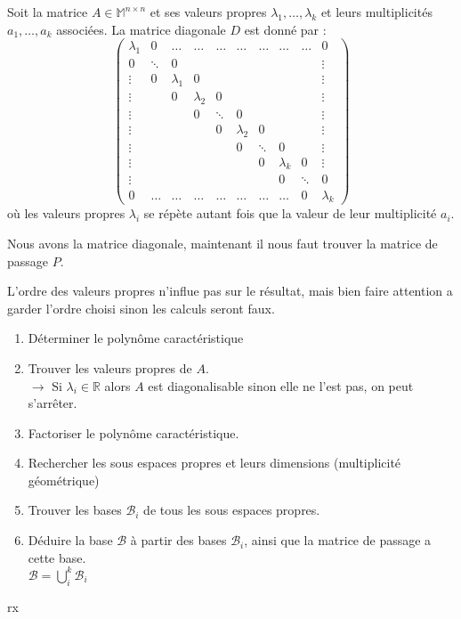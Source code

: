 \begin{prop}
Soit la matrice $A\in\mathbb{M}^{n\times n}$ et ses valeurs propres $\lambda_1,\hdots, \lambda_k$ et leurs multiplicités $a_1,\hdots,a_k$ associées.
La matrice diagonale $D$ est donné par :\\
$$\begin{pmatrix}
\lambda_1 & 0 & \hdots & \hdots & \hdots & \hdots & \hdots & \hdots & \hdots & 0\\
0 & \ddots & 0 & & & & & & & \vdots\\
\vdots & 0 & \lambda_1 & 0 & & & & & & \vdots\\
\vdots & & 0 & \lambda_2 & 0 & & & & & \vdots \\
\vdots & & & 0 & \ddots & 0 & & & & \vdots\\
\vdots & & & & 0 & \lambda_2 & 0 & & & \vdots\\
\vdots & & & & & 0 & \ddots & 0 & & \vdots\\
\vdots & & & & & & 0 & \lambda_k & 0 & \vdots\\
\vdots & & & & & & & 0 & \ddots & 0 \\
0 & \hdots & \hdots & \hdots & \hdots & \hdots & \hdots & \hdots & 0 & \lambda_k
\end{pmatrix}$$
où les valeurs propres $\lambda_i$ se répète autant fois que la valeur de leur multiplicité $a_i$.
\end{prop}
Nous avons la matrice diagonale, maintenant il nous faut trouver la matrice de passage $P$.
\begin{prop}

\end{prop}

L'ordre des valeurs propres n'influe pas sur le résultat, mais bien faire attention a garder l'ordre choisi sinon les calculs seront faux.
\begin{meth}
\begin{enumerate}
    \item Déterminer le polynôme caractéristique
    \item Trouver les valeurs propres de $A$.\\
    $\rightarrow$ Si $\lambda_i\in\mathbb{R}$ alors $A$ est diagonalisable sinon elle ne l'est pas, on peut s'arrêter.
    \item Factoriser le polynôme caractéristique.
    \item Rechercher les sous espaces propres et leurs dimensions (multiplicité géométrique)
    \item Trouver les bases $\mathscr{B}_i$ de tous les sous espaces propres.
    \item Déduire la base $\mathscr{B}$ à partir des bases $\mathscr{B}_i$,
    ainsi que la matrice de passage a cette base.\\
    $\mathscr{B} =\bigcup_{i}^{k}\mathscr{B}_i$
\end{enumerate}
\end{meth}
\begin{ex}
rx
\end{ex}
